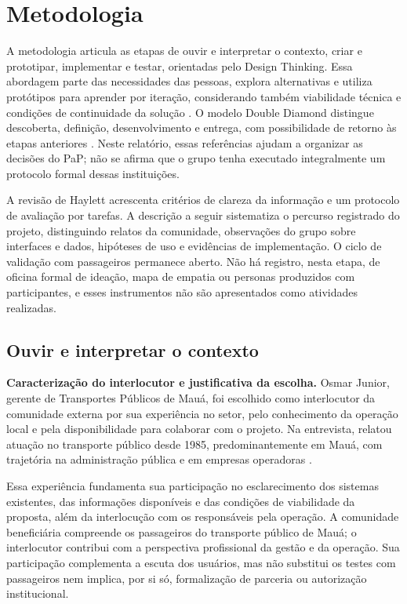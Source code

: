\documentclass[12pt,oneside,a4paper,brazil]{abntex2}
\begin{document}
\section{Metodologia}
A metodologia articula as etapas de ouvir e interpretar o contexto, criar e prototipar, implementar e testar, orientadas pelo Design Thinking. Essa abordagem parte das necessidades das pessoas, explora alternativas e utiliza protótipos para aprender por iteração, considerando também viabilidade técnica e condições de continuidade da solução \citep{ideo-designthinking}. O modelo Double Diamond distingue descoberta, definição, desenvolvimento e entrega, com possibilidade de retorno às etapas anteriores \citep{designcouncil}. Neste relatório, essas referências ajudam a organizar as decisões do PaP; não se afirma que o grupo tenha executado integralmente um protocolo formal dessas instituições.

A revisão de Haylett acrescenta critérios de clareza da informação e um protocolo de avaliação por tarefas. A descrição a seguir sistematiza o percurso registrado do projeto, distinguindo relatos da comunidade, observações do grupo sobre interfaces e dados, hipóteses de uso e evidências de implementação. O ciclo de validação com passageiros permanece aberto. Não há registro, nesta etapa, de oficina formal de ideação, mapa de empatia ou personas produzidos com participantes, e esses instrumentos não são apresentados como atividades realizadas.

\subsection{Ouvir e interpretar o contexto}
\label{sec:escuta-comunidade}
\textbf{Caracterização do interlocutor e justificativa da escolha.} Osmar Junior, gerente de Transportes Públicos de Mauá, foi escolhido como interlocutor da comunidade externa por sua experiência no setor, pelo conhecimento da operação local e pela disponibilidade para colaborar com o projeto. Na entrevista, relatou atuação no transporte público desde 1985, predominantemente em Mauá, com trajetória na administração pública e em empresas operadoras \citep[257--284 s; 424--447 s]{entrevistaosmar2026}.

Essa experiência fundamenta sua participação no esclarecimento dos sistemas existentes, das informações disponíveis e das condições de viabilidade da proposta, além da interlocução com os responsáveis pela operação. A comunidade beneficiária compreende os passageiros do transporte público de Mauá; o interlocutor contribui com a perspectiva profissional da gestão e da operação. Sua participação complementa a escuta dos usuários, mas não substitui os testes com passageiros nem implica, por si só, formalização de parceria ou autorização institucional.
\end{document}

